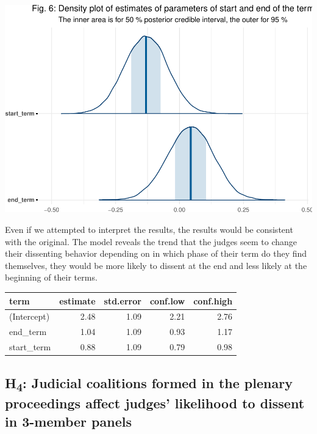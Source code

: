 \documentclass[
  11pt,
]{article}
\begin{document}
\vspace{10pt}

\includegraphics{dissents_article-anonymised_files/figure-latex/interpreting_posterior_term2-1.pdf}

Even if we attempted to interpret the results, the results would be
consistent with the original. The model reveals the trend that the
judges seem to change their dissenting behavior depending on in which
phase of their term do they find themselves, they would be more likely
to dissent at the end and less likely at the beginning of their terms.

\begin{longtable}[]{@{}lrrrr@{}}
\toprule\noalign{}
term & estimate & std.error & conf.low & conf.high \\
\midrule\noalign{}
\endhead
\bottomrule\noalign{}
\endlastfoot
(Intercept) & 2.48 & 1.09 & 2.21 & 2.76 \\
end\_term & 1.04 & 1.09 & 0.93 & 1.17 \\
start\_term & 0.88 & 1.09 & 0.79 & 0.98 \\
\end{longtable}

\hypertarget{h4-judicial-coalitions-formed-in-the-plenary-proceedings-affect-judges-likelihood-to-dissent-in-3-member-panels}{%
\subsection{\texorpdfstring{H\textsubscript{4}: Judicial coalitions
formed in the plenary proceedings affect judges' likelihood to dissent
in 3-member
panels}{H4: Judicial coalitions formed in the plenary proceedings affect judges' likelihood to dissent in 3-member panels}}\label{h4-judicial-coalitions-formed-in-the-plenary-proceedings-affect-judges-likelihood-to-dissent-in-3-member-panels}}
\end{document}
